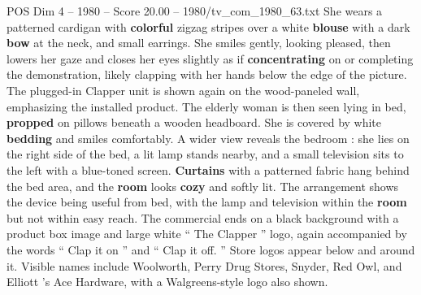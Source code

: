 \begin{textsample}{POS Dim 4 – 1980 – Score 20.00 – 1980/tv\_com\_1980\_63.txt}
She wears a patterned cardigan with \textbf{colorful} zigzag stripes over a white \textbf{blouse} with a dark \textbf{bow} at the neck, and small earrings.
She smiles gently, looking pleased, then lowers her gaze and closes her eyes slightly as if \textbf{concentrating} on or completing the demonstration, likely clapping with her hands below the edge of the picture.
The plugged-in Clapper unit is shown again on the wood-paneled wall, emphasizing the installed product.
The elderly woman is then seen lying in bed, \textbf{propped} on pillows beneath a wooden headboard.
She is covered by white \textbf{bedding} and smiles comfortably.
A wider view reveals the bedroom : she lies on the right side of the bed, a lit lamp stands nearby, and a small television sits to the left with a blue-toned screen. \textbf{Curtains} with a patterned fabric hang behind the bed area, and the \textbf{room} looks \textbf{cozy} and softly lit.
The arrangement shows the device being useful from bed, with the lamp and television within the \textbf{room} but not within easy reach.
The commercial ends on a black background with a product box image and large white “ The Clapper ” logo, again accompanied by the words “ Clap it on ” and “ Clap it off. ” Store logos appear below and around it.
Visible names include Woolworth, Perry Drug Stores, Snyder, Red Owl, and Elliott ’s Ace Hardware, with a Walgreens-style logo also shown.

\end{textsample}
